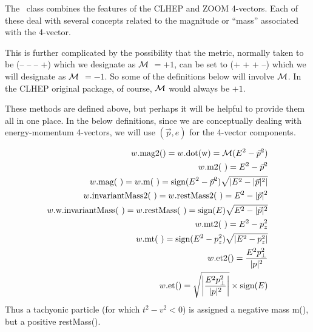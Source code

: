 The \LV\ class combines the features of the CLHEP and ZOOM 4-vectors.
Each of these deal with several concepts related to the magnitude or
``mass'' associated with the 4-vector.  

This is further complicated by the possibility that the metric, 
normally taken to be (-- -- -- +) which we designate as $\cal M$ $= +1$,
can be set to (+ + + --) which we will designate as $\cal M$ $= -1$. 
So some of the definitions below will involve $\cal M$.
In the CLHEP original package, of course, $\cal M$ would always be $+1$.

These methods are defined above, but perhaps it will be helpful to 
provide them all in one place.
In the below definitions, since we are conceptually dealing with 
energy-momentum 4-vectors, we will use $(\vec{p},e)$ for the 4-vector 
components.


\begin{eqnarray}
w\mbox{.mag2()} = w\mbox{.dot(w)} = {\cal M} (E^2 - \vec{p}^2) 		\\
w\mbox{.m2(~)} = E^2 - \vec{p}^2 					\\
w\mbox{.mag(~)} = w\mbox{.m(~)} = 
	\mbox{sign}(E^2 - \vec{p}^2) \sqrt{\left|E^2 - |\vec{p}|^2\right|} \\
w\mbox{.invariantMass2(~)} = w\mbox{.restMass2(~)} = E^2 - |\vec{p}|^2 	\\
w\mbox{.w.invariantMass(~)} = w\mbox{.restMass(~)} =
	\mbox{sign}(E) \sqrt{E^2 - |\vec{p}|^2} \\  
w\mbox{.mt2(~)} = E^2 - p_z^2 	\\
w\mbox{.mt(~)} = 
	\mbox{sign}(E^2 - p_z^2) \sqrt{\left|E^2 - p_z^2\right|} \\
w\mbox{.et2}() = \frac {E^2 p_\perp^2}{|p|^2} \\
w\mbox{.et}() = \sqrt { \left| \frac {E^2 p_\perp^2}{|p|^2} \right| } 
			\times \mbox{sign}(E)
\end{eqnarray}
Thus a tachyonic particle (for which $t^2-v^2 < 0$) is assigned a 
negative mass m(), but a positive restMass().



